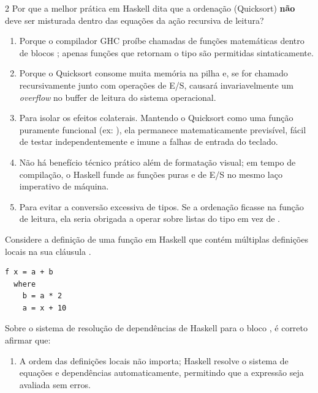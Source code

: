 \documentclass[a4paper,10pt,brazil]{article}
\begin{document}
\begin{multicols}{2}
Por que a melhor prática em Haskell dita que a ordenação (Quicksort) \textbf{não} deve ser misturada dentro das equações da ação recursiva de leitura?

\begin{enumerate}
  \item Porque o compilador GHC proíbe chamadas de funções matemáticas dentro de blocos ; apenas funções que retornam o tipo  são permitidas sintaticamente.

  \item Porque o Quicksort consome muita memória na pilha e, se for chamado recursivamente junto com operações de E/S, causará invariavelmente um \emph{overflow} no buffer de leitura do sistema operacional.

  \item Para isolar os efeitos colaterais. Mantendo o Quicksort como uma função puramente funcional (ex: \haskellinline{[Int] -> [Int]}), ela permanece matematicamente previsível, fácil de testar independentemente e imune a falhas de entrada do teclado.

  \item Não há benefício técnico prático além de formatação visual; em tempo de compilação, o Haskell funde as funções puras e de E/S no mesmo laço imperativo de máquina.

  \item Para evitar a conversão excessiva de tipos. Se a ordenação ficasse na função de leitura, ela seria obrigada a operar sobre listas do tipo \haskellinline{[IO Int]} em vez de \haskellinline{[Int]}.


\end{enumerate}

Considere a definição de uma função  em Haskell que contém múltiplas definições locais na sua cláusula . 
\begin{verbatim}
f x = a + b
  where
    b = a * 2
    a = x + 10
\end{verbatim}
Sobre o sistema de resolução de dependências de Haskell para o bloco , é correto afirmar que:

\begin{enumerate}
  \item A ordem das definições locais não importa; Haskell resolve o sistema de equações e dependências automaticamente, permitindo que a expressão seja avaliada sem erros.


\end{enumerate}
\end{multicols}
\end{document}
